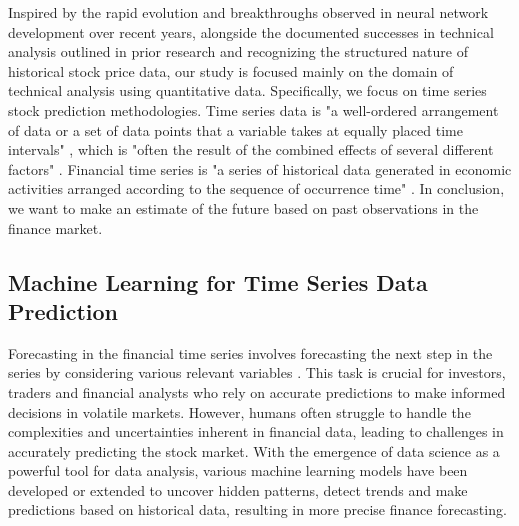 \documentclass{article}
\begin{document}
Inspired by the rapid evolution and breakthroughs observed in neural network development over recent years, alongside the documented successes in technical analysis outlined in prior research \citep{li2020stock} and recognizing the structured nature of historical stock price data, our study is focused mainly on the domain of technical analysis using quantitative data. Specifically, we focus on time series stock prediction methodologies. Time series data is "a well-ordered arrangement of data or a set of data points that a variable takes at equally placed time intervals" \citep{idrees2019prediction}, which is "often the result of the combined effects of several different factors" \citep{cao2019stock}. Financial time series is "a series of historical data generated in economic activities arranged according to the sequence of occurrence time" \citep{cao2019stock}. In conclusion, we want to make an estimate of the future based on past observations in the finance market.

\subsection{Machine Learning for Time Series Data Prediction}

Forecasting in the financial time series involves forecasting the next step in the series by considering various relevant variables \citep{ican2017stock}. This task is crucial for investors, traders and financial analysts who rely on accurate predictions to make informed decisions in volatile markets. However, humans often struggle to handle the complexities and uncertainties inherent in financial data, leading to challenges in accurately predicting the stock market. With the emergence of data science as a powerful tool for data analysis, various machine learning models have been developed or extended to uncover hidden patterns, detect trends and make predictions based on historical data, resulting in more precise finance forecasting. 
\end{document}

